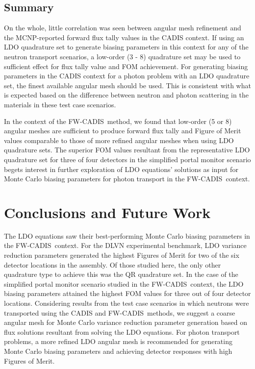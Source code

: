 \documentclass{article} %
\newcommand{\fwc}{\mbox{FW-CADIS}}
\begin{document}
\subsection{Summary}

On the whole, little correlation was seen between angular mesh refinement and
the MCNP-reported forward flux tally values in the CADIS context. If using an
LDO quadrature set to generate biasing parameters in this context for any of
the neutron transport scenarios, a low-order (3 - 8) quadrature set may be used
to sufficient effect for flux tally value and FOM achievement. For generating
biasing parameters in the CADIS context for a photon problem with an LDO
quadrature set, the finest available angular mesh should be used. This is
consistent with what is expected based on the difference between neutron and
photon scattering in the materials in these test case scenarios.

In the context of the \fwc\ method, we found that low-order (5 or 8) angular
meshes are sufficient to produce forward flux tally and Figure of Merit values
comparable to those of more refined angular meshes when using LDO quadrature
sets. The superior FOM values resultant from the representative LDO quadrature
set for three of four detectors in the simplified portal monitor scenario
begets interest in further exploration of LDO equations' solutions as input for
Monte Carlo biasing parameters for photon transport in the \fwc\ context.

\section{Conclusions and Future Work}
\label{sec:conclusions}

The LDO equations saw their best-performing Monte Carlo biasing parameters in
the \fwc\ context. For the DLVN experimental benchmark, LDO variance reduction
parameters generated the highest Figures of Merit for two of the six detector
locations in the assembly. Of those studied here, the only other quadrature
type to achieve this was the QR quadrature set. In the case of the simplified
portal monitor scenario studied in the \fwc\ context, the LDO biasing
parameters attained the highest FOM values for three out of four detector
locations. Considering results from the test case scenarios in which neutrons
were transported using the CADIS and \fwc\ methods, we suggest a coarse
angular mesh for Monte Carlo variance reduction parameter generation based on
flux solutions resultant from solving the LDO equations. For photon transport
problems, a more refined LDO angular mesh is recommended for generating Monte
Carlo biasing parameters and achieving detector responses with high Figures of
Merit.
\end{document}
